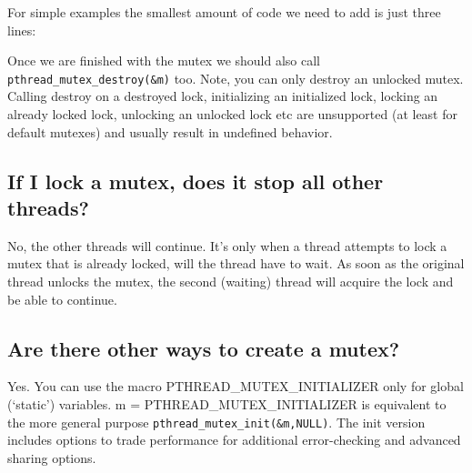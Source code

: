 For simple examples the smallest amount of code we need to add is just
three lines:

\begin{Shaded}
\begin{Highlighting}[]
\end{Highlighting}
\end{Shaded}

Once we are finished with the mutex we should also call
\texttt{pthread\_mutex\_destroy(\&m)} too. Note, you can only destroy an
unlocked mutex. Calling destroy on a destroyed lock, initializing an
initialized lock, locking an already locked lock, unlocking an unlocked
lock etc are unsupported (at least for default mutexes) and usually
result in undefined behavior.

\subsection{If I lock a mutex, does it stop all other
threads?}\label{if-i-lock-a-mutex-does-it-stop-all-other-threads}

No, the other threads will continue. It's only when a thread attempts to
lock a mutex that is already locked, will the thread have to wait. As
soon as the original thread unlocks the mutex, the second (waiting)
thread will acquire the lock and be able to continue.

\subsection{Are there other ways to create a
mutex?}\label{are-there-other-ways-to-create-a-mutex}

Yes. You can use the macro PTHREAD\_MUTEX\_INITIALIZER only for global
(`static') variables. m = PTHREAD\_MUTEX\_INITIALIZER is equivalent to
the more general purpose \texttt{pthread\_mutex\_init(\&m,NULL)}. The
init version includes options to trade performance for additional
error-checking and advanced sharing options.

\begin{Shaded}
\begin{Highlighting}[]
\end{Highlighting}
\end{Shaded}

